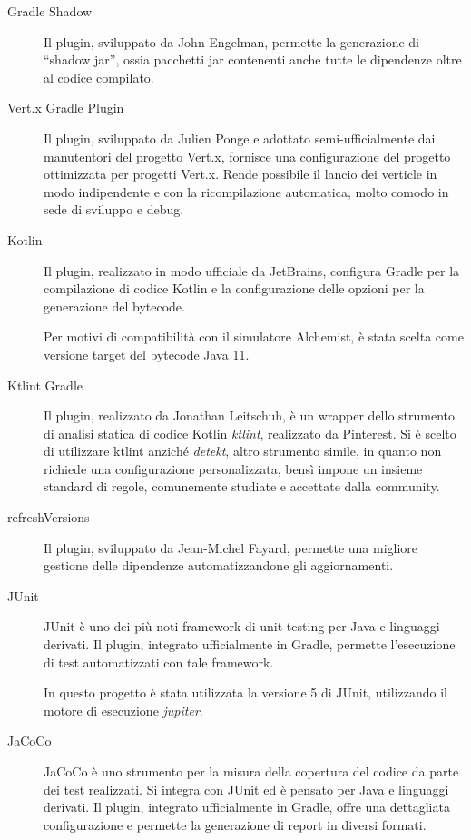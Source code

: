         \begin{description}
          \item[Gradle Shadow]
            Il plugin, sviluppato da John Engelman, permette la generazione di ``shadow jar'', ossia pacchetti jar contenenti anche tutte le dipendenze oltre al codice compilato.

          \item[Vert.x Gradle Plugin]
            Il plugin, sviluppato da Julien Ponge e adottato semi-ufficialmente dai manutentori del progetto Vert.x, fornisce una configurazione del progetto ottimizzata per progetti Vert.x.
            Rende possibile il lancio dei verticle in modo indipendente e con la ricompilazione automatica, molto comodo in sede di sviluppo e debug.

          \item[Kotlin]
            Il plugin, realizzato in modo ufficiale da JetBrains, configura Gradle per la compilazione di codice Kotlin e la configurazione delle opzioni per la generazione del bytecode.

            Per motivi di compatibilità con il simulatore Alchemist, è stata scelta come versione target del bytecode Java 11.

          \item[Ktlint Gradle]
            Il plugin, realizzato da Jonathan Leitschuh, è un wrapper dello strumento di analisi statica di codice Kotlin \emph{ktlint}, realizzato da Pinterest.
            Si è scelto di utilizzare ktlint anziché \emph{detekt}, altro strumento simile, in quanto non richiede una configurazione personalizzata, bensì impone un insieme standard di regole, comunemente studiate e accettate dalla community.

          \item[refreshVersions]
            Il plugin, sviluppato da Jean-Michel Fayard, permette una migliore gestione delle dipendenze automatizzandone gli aggiornamenti.

          \item[JUnit]
            JUnit è uno dei più noti framework di unit testing per Java e linguaggi derivati.
            Il plugin, integrato ufficialmente in Gradle, permette l'esecuzione di test automatizzati con tale framework.

            In questo progetto è stata utilizzata la versione 5 di JUnit, utilizzando il motore di esecuzione \emph{jupiter}.
          \item[JaCoCo]
            JaCoCo è uno strumento per la misura della copertura del codice da parte dei test realizzati.
            Si integra con JUnit ed è pensato per Java e linguaggi derivati.
            Il plugin, integrato ufficialmente in Gradle, offre una dettagliata configurazione e permette la generazione di report in diversi formati.
        \end{description}

